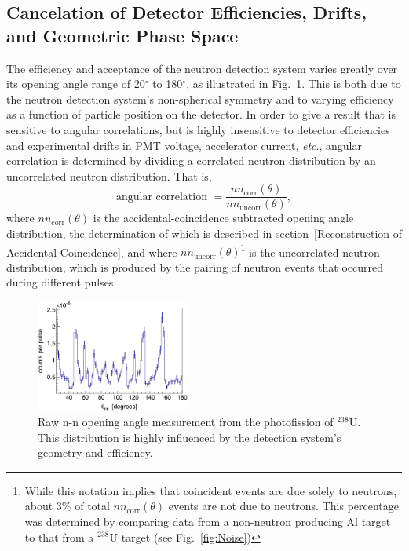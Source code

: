 \documentclass[%
 reprint,
 amsmath,amssymb,
 aps,
 nofootinbib
]{revtex4-1}
\begin{document}
\subsection{Cancelation of Detector Efficiencies, Drifts, and Geometric Phase Space}
\label{subsec:SPDPCancelation}
The efficiency and acceptance of the neutron detection system varies greatly over its opening angle range of 20$^{\circ}$ to 180$^{\circ}$, as illustrated in Fig.~\ref{fig:DetAcceptance}.
This is both due to the neutron detection system's non-spherical symmetry and to varying efficiency as a function of particle position on the detector.
In order to give a result that is sensitive to angular correlations, but is highly insensitive to detector efficiencies and experimental drifts in PMT voltage, accelerator current, \emph{etc}., angular correlation is determined by dividing a correlated neutron distribution by an uncorrelated neutron distribution. That is,
\begin{equation}
\label{eq:angularCorr}
\text{angular correlation }  = \frac{nn_{\text{corr}}(\theta)}{nn_{\text{uncorr}}(\theta)},
\end{equation}
where $nn_{\text{corr}}(\theta)$ is the accidental-coincidence subtracted opening angle distribution, the determination of which is described in section~\ref{Reconstruction of Accidental Coincidence}, and where $nn_{\text{uncorr}}(\theta)$\footnote{While this notation implies that coincident events are due solely to neutrons, about 3\% of total  $nn_{\text{corr}}(\theta)$ events are not due to neutrons. This percentage was determined by comparing data from a non-neutron producing Al target to that from a $^{238}$U target (see Fig.~\ref{fig:Noise})} is the uncorrelated neutron distribution, which is produced by the pairing of neutron events that occurred during different pulses.
\begin{figure}[h]
\includegraphics[width=0.45\textwidth]{DetAcceptance.png}
\caption{Raw n-n opening angle measurement from the photofission of $^{238}$U. 
This distribution is highly influenced by the detection system's geometry and efficiency.
}
\label{fig:DetAcceptance}
\end{figure}
\end{document}
